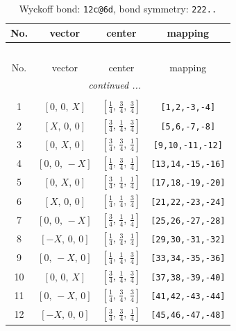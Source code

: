 \documentclass[fleqn,8pt]{jsarticle}
\begin{document}
\renewcommand{\arraystretch}{1.2}
\begin{longtable}{cccc}
\caption{Wyckoff bond: {\tt 12c@6d}, bond symmetry: {\tt 222..}}
 \\
 \hline \hline
No. & vector & center & mapping \\ \hline \endfirsthead

\multicolumn{3}{l}{\tablename\ \thetable{}} \\
 \hline \hline
No. & vector & center & mapping \\ \hline \endhead

 \hline \hline
\multicolumn{3}{r}{\footnotesize\it continued ...} \\ \endfoot

 \hline \hline
\multicolumn{3}{r}{} \\ \endlastfoot

1 & $\left[ 0,\, 0,\, X \right]$ & $\left[ \frac{1}{4},\, \frac{3}{4},\, \frac{3}{4} \right]$ & {\tt [1,2,-3,-4]} \\ \hline
2 & $\left[ X,\, 0,\, 0 \right]$ & $\left[ \frac{3}{4},\, \frac{1}{4},\, \frac{3}{4} \right]$ & {\tt [5,6,-7,-8]} \\ \hline
3 & $\left[ 0,\, X,\, 0 \right]$ & $\left[ \frac{3}{4},\, \frac{3}{4},\, \frac{1}{4} \right]$ & {\tt [9,10,-11,-12]} \\ \hline
4 & $\left[ 0,\, 0,\, - X \right]$ & $\left[ \frac{1}{4},\, \frac{3}{4},\, \frac{1}{4} \right]$ & {\tt [13,14,-15,-16]} \\ \hline
5 & $\left[ 0,\, X,\, 0 \right]$ & $\left[ \frac{3}{4},\, \frac{1}{4},\, \frac{1}{4} \right]$ & {\tt [17,18,-19,-20]} \\ \hline
6 & $\left[ X,\, 0,\, 0 \right]$ & $\left[ \frac{1}{4},\, \frac{1}{4},\, \frac{3}{4} \right]$ & {\tt [21,22,-23,-24]} \\ \hline
7 & $\left[ 0,\, 0,\, - X \right]$ & $\left[ \frac{3}{4},\, \frac{1}{4},\, \frac{1}{4} \right]$ & {\tt [25,26,-27,-28]} \\ \hline
8 & $\left[ - X,\, 0,\, 0 \right]$ & $\left[ \frac{1}{4},\, \frac{3}{4},\, \frac{1}{4} \right]$ & {\tt [29,30,-31,-32]} \\ \hline
9 & $\left[ 0,\, - X,\, 0 \right]$ & $\left[ \frac{1}{4},\, \frac{1}{4},\, \frac{3}{4} \right]$ & {\tt [33,34,-35,-36]} \\ \hline
10 & $\left[ 0,\, 0,\, X \right]$ & $\left[ \frac{3}{4},\, \frac{1}{4},\, \frac{3}{4} \right]$ & {\tt [37,38,-39,-40]} \\ \hline
11 & $\left[ 0,\, - X,\, 0 \right]$ & $\left[ \frac{1}{4},\, \frac{3}{4},\, \frac{3}{4} \right]$ & {\tt [41,42,-43,-44]} \\ \hline
12 & $\left[ - X,\, 0,\, 0 \right]$ & $\left[ \frac{3}{4},\, \frac{3}{4},\, \frac{1}{4} \right]$ & {\tt [45,46,-47,-48]} \\
\end{longtable}
\end{document}
